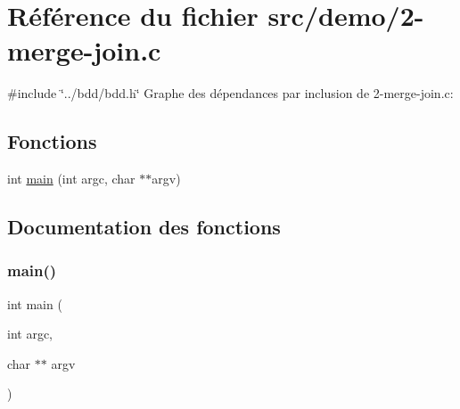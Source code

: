 \hypertarget{2-merge-join_8c}{}\section{Référence du fichier src/demo/2-\/merge-\/join.c}
\label{2-merge-join_8c}
{\ttfamily \#include \char`\"{}../bdd/bdd.\+h\char`\"{}}\newline
Graphe des dépendances par inclusion de 2-\/merge-\/join.c\+:
\subsection*{Fonctions}
\begin{DoxyCompactItemize}
\item 
int \hyperlink{2-merge-join_8c_a3c04138a5bfe5d72780bb7e82a18e627}{main} (int argc, char $\ast$$\ast$argv)
\end{DoxyCompactItemize}


\subsection{Documentation des fonctions}
\mbox{\label{2-merge-join_8c_a3c04138a5bfe5d72780bb7e82a18e627}} 
\subsubsection{\texorpdfstring{main()}{main()}}
{\footnotesize\ttfamily int main (\begin{DoxyParamCaption}\item[{int}]{argc,  }\item[{char $\ast$$\ast$}]{argv }\end{DoxyParamCaption})}

